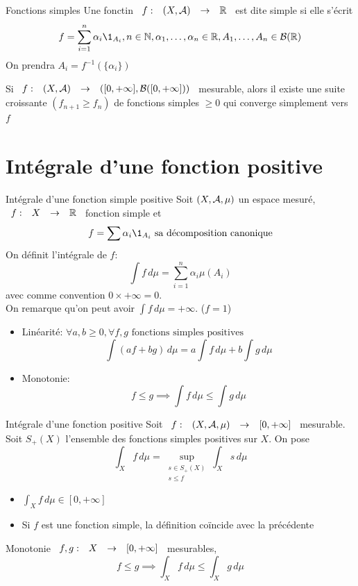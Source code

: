 \documentclass[]{report}
\begin{document}
\begin{df}{Fonctions simples}{}
    Une fonctin $\begin{array}{ccccc} f : & (X,\mathcal{A}) & \to & \mathbb{R} \end{array}$ est dite simple si elle s'écrit
    \[f=\sum_{i=1}^{n}\alpha_i \1_{A_i},n\in \N,\alpha_1,\ldots,\alpha_n\in \R,A_1,\ldots,A_n\in \Br(\R)\]
    On prendra $A_i=f^{-1}(\{\alpha_i\})$
\end{df}

\begin{tm}{}{}
    Si $\begin{array}{ccccc} f : & (X,\mathcal{A}) & \to & \left([0,+\infty],\mathcal{B}([0,+\infty])\right) \end{array}$ mesurable, alors il existe une suite croissante $(f_{n+1}\ge f_n)$ de fonctions simples $\ge 0$ qui converge simplement vers $f$
\end{tm}

\section{Intégrale d'une fonction positive}

\begin{df}{Intégrale d'une fonction simple positive}{}
    Soit $(X,\mathcal{A},\mu)$ un espace mesuré, $\begin{array}{ccccc} f : & X & \to & \mathbb{R} \end{array}$ fonction simple et
    \[f=\sum \alpha_i \1_{A_i} \text{ sa décomposition canonique}\]
    On définit l'intégrale de $f$:
    \[\int f \, d\mu=\sum_{i=1}^{n} \alpha_i \mu(A_i)\]
    avec comme convention $0\times +\infty = 0$.\\
    On remarque qu'on peut avoir $\int f\, d\mu=+\infty$. ($f=1$)
\end{df}

\begin{prop}{}{}
    \begin{itemize}
        \item Linéarité: $\forall a,b\ge 0, \forall f,g \text{ fonctions simples positives}$
        \[\int (af+bg)\, d\mu=a\int f\, d\mu + b\int g \, d\mu\]
        \item Monotonie:
        \[f\le g\implies \int f\, d\mu \le \int g \, d\mu\]
    \end{itemize}
\end{prop}

\begin{df}{Intégrale d'une fonction positive}{}
    Soit $\begin{array}{ccccc} f : & (X,\mathcal{A},\mu) & \to & [0,+\infty] \end{array}$ mesurable. Soit $S_+(X)$ l'ensemble des fonctions simples positives sur $X$. On pose
    \[\int_X f\, d\mu=\sup_{\substack{s\in S_+(X)\\ s\le f}}  \int_X s\, d\mu\]
\end{df}

\begin{re}{}{}
    \begin{itemize}
        \item $\int_X f\, d\mu \in [0,+\infty]$
        \item Si $f$ est une fonction simple, la définition coïncide avec la précédente
    \end{itemize}
\end{re}

\begin{prop}{Monotonie}{}
    $\begin{array}{ccccc} f,g : & X & \to & [0,+\infty] \end{array}$ mesurables,
    \[f\le g \implies \int_X f\, d\mu \le \int_X g \, d\mu\]
\end{prop}
\end{document}
